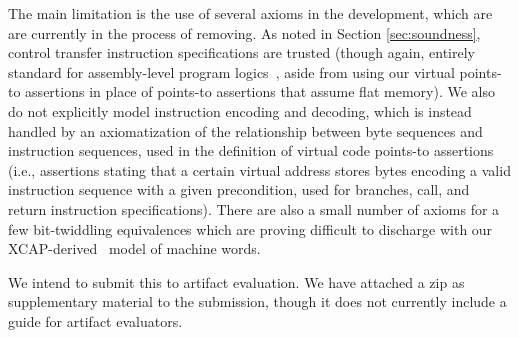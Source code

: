 \documentclass[acmsmall,screen,nonacm,review,anonymous]{acmart}
\begin{document}
The main limitation is the use of several axioms in the development, which are are currently
in the process of removing. As noted in Section \ref{sec:soundness}, control transfer instruction
specifications are trusted (though again, entirely standard for assembly-level program logics~\cite{ni2007contexts,Ni2006codeptrs},
aside from using our virtual points-to assertions in place of points-to assertions that assume flat memory).
We also do not explicitly model instruction
encoding and decoding, which is instead handled by an axiomatization of the relationship between
byte sequences and instruction sequences, used in the definition of virtual code points-to
assertions (i.e., assertions stating that a certain virtual address stores bytes
encoding a valid instruction sequence with a given precondition, used for branches, call, and return instruction
specifications). 
There are also a small number of axioms for a few bit-twiddling equivalences which are proving difficult to discharge
with our XCAP-derived~\cite{Chlipala2013Bedrock} model of machine words.

We intend to submit this to artifact evaluation.
We have attached a zip as supplementary material to the submission, though it does not
currently include
a guide for artifact evaluators.




\appendix
\end{document}
